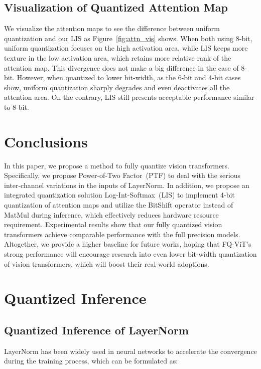 \documentclass{article}
\begin{document}
\subsection{Visualization of Quantized Attention Map}
We visualize the attention maps to see the difference between uniform quantization and our LIS as Figure~\ref{fig:attn_vis} shows. When both using 8-bit, uniform quantization focuses on the high activation area, while LIS keeps more texture in the low activation area, which retains more relative rank of the attention map. This divergence does not make a big difference in the case of 8-bit. However, when quantized to lower bit-width, as the 6-bit and 4-bit cases show, uniform quantization sharply degrades and even deactivates all the attention area. On the contrary, LIS still presents acceptable performance similar to 8-bit.

\section{Conclusions}
In this paper, we propose a method to fully quantize vision transformers. Specifically, we propose Power-of-Two Factor~(PTF) to deal with the serious inter-channel variations in the inputs of LayerNorm. In addition, we propose an integrated quantization solution Log-Int-Softmax~(LIS) to implement 4-bit quantization of attention maps and utilize the BitShift operator instead of MatMul during inference, which effectively reduces hardware resource requirement. 
Experimental results show that our fully quantized vision transformers achieve comparable performance with the full precision models.
Altogether, we provide a higher baseline for future works, hoping that FQ-ViT’s strong performance will encourage research into even lower bit-width quantization of vision transformers, which will boost their real-world adoptions.

\clearpage
\newpage
\small{
}

\newpage
\appendix
\section{Quantized Inference}
\subsection{Quantized Inference of LayerNorm}
LayerNorm has been widely used in neural networks to accelerate the convergence during the training process, which can be formulated as:
\end{document}
